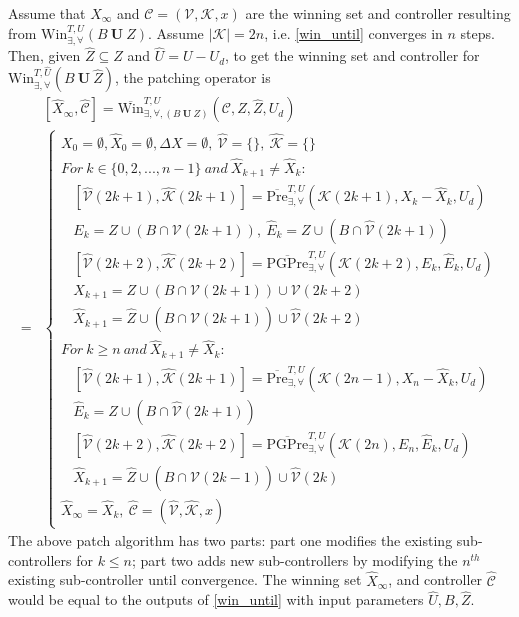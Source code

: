 Assume that $ X_\infty $ and $ \mathcal{C}=(\mathcal{V},\mathcal{K},x) $ are the winning set and controller resulting from $ \text{Win}_{\exists,\forall}^{T,U}(B\mathbf{\ U\ }Z) $. Assume $ \vert \mathcal{K}\vert = 2n $, i.e. \eqref{win_until} converges in $ n $ steps. Then, given $ \widehat{Z}\subseteq Z $ and $ \widehat{U}= U-U_d $, to get the winning set and controller for $ \text{Win}_{\exists,\forall}^{T,\widehat{U}}(B\mathbf{\ U\ }\widehat{Z}) $, the patching operator is
\begin{align}
&[\widehat{X}_\infty, \widehat{\mathcal{C}}]=\overline{\text{Win}}^{T, U}_{\exists,\forall, (B\mathbf{\ U\ }Z)}(\mathcal{C},Z,\widehat{Z}, U_d)\\
=&\begin{cases}
X_0 = \emptyset, \widehat{X}_0 = \emptyset, \Delta X = \emptyset, \ \widehat{\mathcal{V}}=\{\},\ \widehat{\mathcal{K}}=\{\}\\
For ~ k\in \{0,2,...,n-1\}\ and\ \widehat{X}_{k+1}\not=\widehat{X}_k:\\
\ \ \ \ [\widehat{\mathcal{V}}(2k+1),\widehat{\mathcal{K}}(2k+1)] = \overline{\text{Pre}}_{\exists,\forall}^{T,U}(\mathcal{K}(2k+1),X_{k}-\widehat{X}_{k}, U_d)\\
\ \ \ \ E_k = Z\cup (B\cap \mathcal{V}(2k+1)),\ \widehat{E}_k =  Z\cup (B\cap \widehat{\mathcal{V}}(2k+1))\\
\ \ \ \ [\widehat{\mathcal{V}}(2k+2),\widehat{\mathcal{K}}(2k+2)] = \overline{\text{PGPre}}_{\exists,\forall}^{T,U}(\mathcal{K}(2k+2),E_k, \widehat{E}_k,U_d)\\ 
\ \ \ \ X_{k+1} = Z\cup (B\cap \mathcal{V}(2k+1)) \cup \mathcal{V}(2k+2)\\
\ \ \ \ \widehat{X}_{k+1} =\widehat{Z}\cup (B\cap \widehat{\mathcal{V}}(2k+1)) \cup \widehat{\mathcal{V}}(2k+2)\\
For~k\geq n\ and\ \widehat{X}_{k+1}\not=\widehat{X}_k:	\\
\ \ \ \ [\widehat{\mathcal{V}}(2k+1),\widehat{\mathcal{K}}(2k+1)] = \overline{\text{Pre}}_{\exists,\forall}^{T,U}(\mathcal{K}(2n-1),X_{n}-\widehat{X}_{k}, U_d)\\
\ \ \ \ \widehat{E}_k =  Z\cup (B\cap \widehat{\mathcal{V}}(2k+1))\\
\ \ \ \ [\widehat{\mathcal{V}}(2k+2),\widehat{\mathcal{K}}(2k+2)] = \overline{\text{PGPre}}_{\exists,\forall}^{T,U}(\mathcal{K}(2n),E_n, \widehat{E}_k,U_d)\\
\ \ \ \ \widehat{X}_{k+1} =\widehat{Z}\cup (B\cap \widehat{\mathcal{V}}(2k-1)) \cup \widehat{\mathcal{V}}(2k)\\
\widehat{X}_\infty = \widehat{X}_k,\ \widehat{\mathcal{C}} = (\widehat{\mathcal{V}},\widehat{\mathcal{K}},x)
\end{cases} \label{patch_until}
\end{align}
The above patch algorithm has two parts: part one modifies the existing sub-controllers for $ k\leq n $; part two adds new sub-controllers by modifying the $ n^{th} $ existing sub-controller until convergence. The winning set $ \widehat{X}_{\infty} $, and controller $ \widehat{\mathcal{C}} $ would be equal to the outputs of \eqref{win_until} with input parameters $ \widehat{U},B,\widehat{Z} $. 

